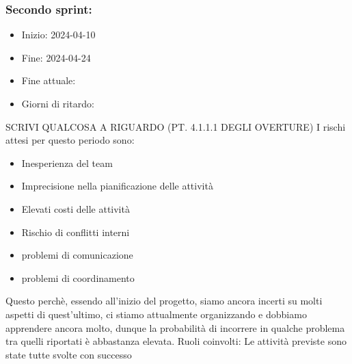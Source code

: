     \subsubsection{Secondo sprint:}
    \begin{itemize}
        \item Inizio: 2024-04-10
        \item Fine: 2024-04-24
        \item Fine attuale:
        \item Giorni di ritardo:
    \end{itemize}
    SCRIVI QUALCOSA A RIGUARDO (PT. 4.1.1.1 DEGLI OVERTURE)
    I rischi attesi per questo periodo sono:
    \begin{itemize}
        \item Inesperienza del team
        \item Imprecisione nella pianificazione delle attività
        \item Elevati costi delle attività
        \item Rischio di conflitti interni 
        \item problemi di comunicazione
        \item problemi di coordinamento
    \end{itemize}
    Questo perchè, essendo all’inizio del progetto, siamo ancora incerti su molti aspetti di quest’ultimo, ci stiamo attualmente organizzando e dobbiamo apprendere ancora molto, dunque la probabilità di incorrere in qualche problema tra quelli riportati è abbastanza elevata.
    Ruoli coinvolti: 
    Le attività previste sono state tutte svolte con successo


